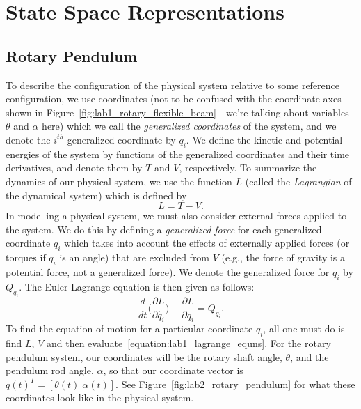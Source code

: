 \chapter{State Space Representations}\label{chap:EOMs}

\section{Rotary Pendulum}
To describe the configuration of the physical system relative to some reference configuration, we use coordinates (not to be confused with the coordinate axes shown in Figure~\ref{fig:lab1_rotary_flexible_beam} - we're talking about variables $\theta$ and $\alpha$ here) which we call the \emph{generalized coordinates} of the system, and we denote the $i^{th}$ generalized coordinate by $q_i$. We define the kinetic and potential energies of the system by functions of the generalized coordinates and their time derivatives, and denote them by $T$ and $V$, respectively. To summarize the dynamics of our physical system, we use the function $L$ (called the \emph{Lagrangian} of the dynamical system) which is defined by
\[
    L=T-V.
\]
In modelling a physical system, we must also consider external forces applied to the system. We do this by defining a \emph{generalized force} for each generalized coordinate $q_i$ which takes into account the effects of externally applied forces (or torques if $q_i$ is an angle) that are excluded from $V$ (e.g., the force of gravity is a potential force, not a generalized force). We denote the generalized force for $q_i$ by $Q_{q_i}$.
The Euler-Lagrange equation is then given as follows:
\begin{equation}\label{equation:lab1_lagrange_equns}
    \frac{d}{dt} \Bigg(\frac{\partial L}{\partial \dot{q_i}}\Bigg)  - \frac{\partial L}{\partial q_i} = Q_{q_i}.
\end{equation}
To find the equation of motion for a particular coordinate $q_i$, all one must do is find $L$, $V$ and then evaluate~\eqref{equation:lab1_lagrange_equns}. For the rotary pendulum system, our coordinates will be the rotary shaft angle, $\theta$, and the pendulum rod angle, $\alpha$, so that our coordinate vector is $q(t)^T=[\theta(t) \; \alpha(t)]$. See Figure~\ref{fig:lab2_rotary_pendulum} for what these coordinates look like in the physical system.

